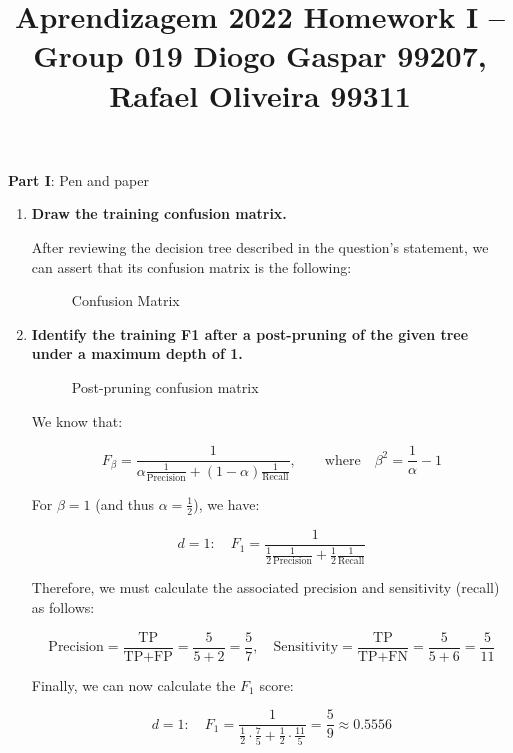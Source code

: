 \documentclass[12pt]{article}
\title{\large{Aprendizagem 2022}\vskip 0.2cm Homework I -- Group 019\vskip 0.2cm Diogo Gaspar 99207, Rafael Oliveira 99311}
\date{}
\begin{document}
\maketitle
\center\large{\vskip -2.5cm\textbf{Part I}: Pen and paper}
\begin{enumerate}[leftmargin=\labelsep]
  \item \textbf{Draw the training confusion matrix.}

        After reviewing the decision tree described in the question's statement,
        we can assert that its confusion matrix is the following:

        \begin{figure}[htpb]
          \centering
          
          \caption{Confusion Matrix}
        \end{figure}

  \item \textbf{Identify the training F1 after a post-pruning of the given tree under a maximum depth of 1.}

        \begin{figure}[htpb]
          \centering
          
          \caption{Post-pruning confusion matrix}
        \end{figure}

        We know that:

        $$
          F_\beta = \frac{1}{\alpha\frac{1}{\text{Precision}} + (1 - \alpha)\frac{1}{\text{Recall}}},\qquad\text{where}\quad\beta^2 = \frac{1}{\alpha} - 1
        $$

        For $\beta = 1$ (and thus $\alpha = \frac{1}{2}$), we have:

        $$
          d = 1: \quad F_1 = \frac{1}{\frac{1}{2}\frac{1}{\text{Precision}} + \frac{1}{2}\frac{1}{\text{Recall}}}
        $$

        Therefore, we must calculate the associated precision and sensitivity (recall) as follows:

        $$
          \text{Precision} = \frac{\text{TP}}{\text{TP} + \text{FP}} = \frac{5}{5 + 2} = \frac{5}{7}, \quad \text{Sensitivity} = \frac{\text{TP}}{\text{TP} + \text{FN}} = \frac{5}{5 + 6} = \frac{5}{11}
        $$

        Finally, we can now calculate the $F_1$ score:

        $$
          d = 1: \quad F_1 = \frac{1}{\frac{1}{2}\cdot\frac{7}{5} + \frac{1}{2}\cdot\frac{11}{5}} = \frac{5}{9} \approx 0.5556
        $$


\end{enumerate}
\end{document}
